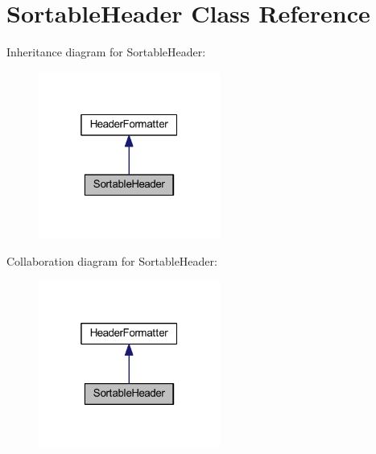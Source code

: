 \hypertarget{classhamburgscleanest_1_1_data_tables_1_1_models_1_1_header_formatters_1_1_sortable_header}{}\section{Sortable\+Header Class Reference}
\label{classhamburgscleanest_1_1_data_tables_1_1_models_1_1_header_formatters_1_1_sortable_header}


Inheritance diagram for Sortable\+Header\+:\nopagebreak
\begin{figure}[H]
\begin{center}
\leavevmode
\includegraphics[width=169pt]{classhamburgscleanest_1_1_data_tables_1_1_models_1_1_header_formatters_1_1_sortable_header__inherit__graph}
\end{center}
\end{figure}


Collaboration diagram for Sortable\+Header\+:\nopagebreak
\begin{figure}[H]
\begin{center}
\leavevmode
\includegraphics[width=169pt]{classhamburgscleanest_1_1_data_tables_1_1_models_1_1_header_formatters_1_1_sortable_header__coll__graph}
\end{center}
\end{figure}
